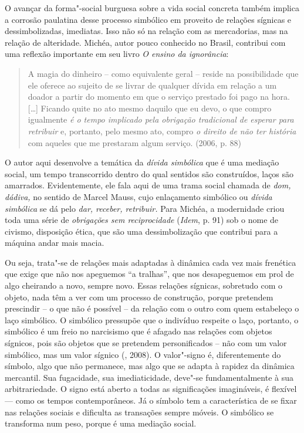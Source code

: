 {O avançar da forma"-social burguesa sobre a vida social concreta também
implica a corrosão paulatina desse processo simbólico em proveito de
relações sígnicas e dessimbolizadas, imediatas. Isso não só na relação
com as mercadorias, mas na relação de alteridade. Michéa, autor pouco
conhecido no Brasil, contribui com uma reflexão importante em seu livro
\emph{O ensino da ignorância}:

\begin{quote}
A magia do dinheiro -- como equivalente geral -- reside na possibilidade
que ele oferece ao sujeito de se livrar de qualquer dívida em relação a
um doador a partir do momento em que o serviço prestado foi pago na
hora. [\ldots{}] Ficando quite no ato mesmo daquilo que eu devo, o
que compro igualmente \emph{é o tempo implicado pela obrigação
tradicional de esperar para retribuir} e, portanto, pelo mesmo ato,
compro \emph{o direito de não ter história} com aqueles que me prestaram
algum serviço. (2006, p. 88)
\end{quote}

O autor aqui desenvolve a temática da \emph{dívida simbólica} que é uma
mediação social, um tempo transcorrido dentro do qual sentidos são
construídos, laços são amarrados. Evidentemente, ele fala aqui de uma
trama social chamada de \emph{dom, dádiva,} no sentido de Marcel Mauss,
cujo enlaçamento simbólico ou \emph{dívida simbólica} se dá pelo
\emph{dar, receber, retribuir.} Para Michéa, a modernidade criou toda
uma série de \emph{obrigações sem reciprocidade} (\emph{Idem}, p. 91)
sob o nome de civismo, disposição ética, que são uma dessimbolização que
contribui para a máquina andar mais macia.

Ou seja, trata"-se de relações mais adaptadas à dinâmica cada vez mais
frenética que exige que não nos apeguemos ``a tralhas'', que nos
desapeguemos em prol de algo cheirando a novo, sempre novo. Essas
relações sígnicas, sobretudo com o objeto, nada têm a ver com um
processo de construção, porque pretendem prescindir -- o que não é
possível -- da relação com o outro com quem estabeleço o laço simbólico.
O simbólico pressupõe que o indivíduo respeite o laço, portanto, o
simbólico é um freio no narcisismo que é afagado nas relações com
objetos sígnicos, pois são objetos que se pretendem personificados --
não com um valor simbólico, mas um valor sígnico (, 2008). O
valor"-signo é, diferentemente do símbolo, algo que não permanece, mas
algo que se adapta à rapidez da dinâmica mercantil. Sua fugacidade, sua
imediaticidade, deve"-se fundamentalmente à sua arbitrariedade. O signo
está aberto a todas as significações imagináveis, é flexível --- como os
tempos contemporâneos. Já o símbolo tem a característica de se fixar nas
relações sociais e dificulta as transações sempre móveis. O simbólico se
transforma num peso, porque é uma mediação social.

}
